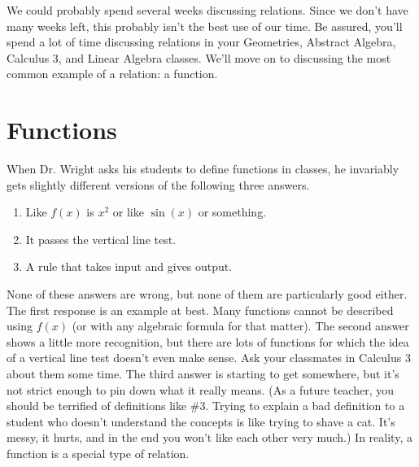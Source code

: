 \documentclass[12 pt]{article}
\theoremstyle{definition}
\theoremstyle{plain}
\theoremstyle{mytheorem}
\theoremstyle{myexample}
\theoremstyle{mydefinition}
\begin{document}
We could probably spend several weeks discussing relations.  Since we don't have many weeks left, this probably isn't the best use of our time.  Be assured, you'll spend a lot of time discussing relations in your Geometries, Abstract Algebra, Calculus 3, and Linear Algebra classes.  We'll move on to discussing the most common example of a relation: a function.

\section{Functions}

When Dr. Wright asks his students to define functions in classes, he invariably gets slightly different versions of the following three answers.
	\begin{enumerate}
	\item Like $f(x)$ is $x^2$ or like $\sin(x)$ or something.
	\item It passes the vertical line test.
	\item A rule that takes input and gives output.
	\end{enumerate}
	
None of these answers are wrong, but none of them are particularly good either.  The first response is an example at best.  Many functions cannot be described using $f(x)$ (or with any algebraic formula for that matter).  The second answer shows a little more recognition, but there are lots of functions for which the idea of a vertical line test doesn't even make sense.  Ask your classmates in Calculus 3 about them some time.  The third answer is starting to get somewhere, but it's not strict enough to pin down what it really means.  (As a future teacher, you should be terrified of definitions like \#3.  Trying to explain a bad definition to a student who doesn't understand the concepts is like trying to shave a cat.  It's messy, it hurts, and in the end you won't like each other very much.)  In reality, a function is a special type of relation.
\end{document}
